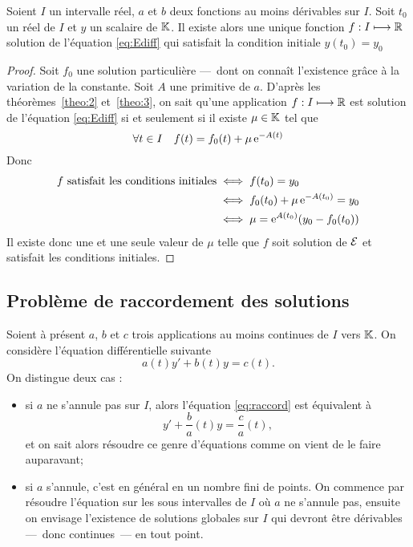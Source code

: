 %
\begin{theo} 
  \label{theo:4}
  Soient $I$ un intervalle réel, $a$ et $b$ deux fonctions au moins dérivables sur $I$. Soit $t_0$ un réel de $I$ et $y$ un scalaire de $\mathbb{K}$. Il existe alors une unique fonction $f:I \longmapsto \mathbb{R}$ solution de l'équation \eqref{eq:Ediff} qui satisfait la condition initiale $y(t_0)=y_0$
\end{theo}
\begin{proof}
  Soit $f_0$ une solution particulière ---~dont on connaît l'existence grâce à la variation de la constante. Soit $A$ une primitive de $a$. D'après les théorèmes~\ref{theo:2} et~\ref{theo:3}, on sait qu'une application $f:I \longmapsto \mathbb{R}$ est solution de l'équation \eqref{eq:Ediff} si et seulement si il existe $\mu \in \mathbb{K}$ tel que
  \begin{equation}
    \forall t \in I \quad f(t)=f_0(t) + \mu \operatorname{e}^{-A(t)}
  \end{equation}
Donc 
\begin{align}
  f \text{~satisfait les conditions initiales} & \iff f(t_0)=y_0 \\ & \iff f_0(t_0)+\mu\operatorname{e}^{-A(t_0)} = y_0 \\ & \iff \mu = \operatorname{e}^{A(t_0)}(y_0-f_0(t_0))
\end{align}
Il existe donc une et une seule valeur de $\mu$ telle que $f$ soit solution de $\mathcal{E}$ et satisfait les conditions initiales.
\end{proof}

\subsection{Problème de raccordement des solutions}
\label{subsec:pbmraccordement}
Soient à présent $a$, $b$ et $c$ trois applications au moins continues de $I$ vers $\mathbb{K}$. On considère l'équation différentielle suivante
\begin{equation}
  \label{eq:raccord}
  a(t) y'+b(t)y=c(t).
\end{equation}
On distingue deux cas :
\begin{itemize}
\item si $a$ ne s'annule pas sur $I$, alors l'équation \eqref{eq:raccord} est équivalent à
  \begin{equation}
    y' + \frac{b}{a}(t) y = \frac{c}{a}(t),
  \end{equation}
et on sait alors résoudre ce genre d'équations comme on vient de le faire auparavant;
\item si $a$ s'annule, c'est en général en un nombre fini de points. On commence par résoudre l'équation sur les sous intervalles de $I$ où $a$ ne s'annule pas, ensuite on envisage l'existence de solutions globales sur $I$ qui devront être dérivables ---~donc continues~--- en tout point.
\end{itemize}
%

